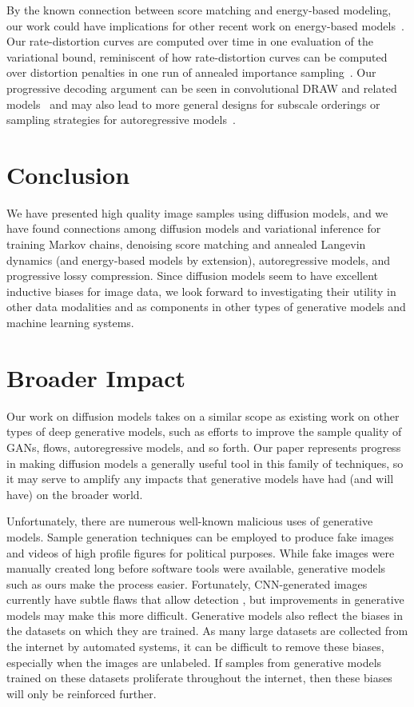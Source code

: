 By the known connection between score matching and energy-based modeling, our work could have implications for other recent work on energy-based models~\citep{xie2016theory,xie2017synthesizing,xie2018learning,gao2018learning,xie2019learning,gao2020flow,du2019implicit,nijkamp2019anatomy,grathwohl2020your,deng2020residual}. Our rate-distortion curves are computed over time in one evaluation of the variational bound, reminiscent of how rate-distortion curves can be computed over distortion penalties in one run of annealed importance sampling~\citep{huang2020evaluating}. Our progressive decoding argument can be seen in convolutional DRAW and related models~\citep{gregor2016towards,nichol2020vq} and may also lead to more general designs for subscale orderings or sampling strategies for autoregressive models~\citep{menick2018generating,wiggers2020predictive}.

\section{Conclusion}

We have presented high quality image samples using diffusion models, and we have found connections among diffusion models and variational inference for training Markov chains, denoising score matching and annealed Langevin dynamics (and energy-based models by extension), autoregressive models, and progressive lossy compression. Since diffusion models seem to have excellent inductive biases for image data, we look forward to investigating their utility in other data modalities and as components in other types of generative models and machine learning systems.

\section*{Broader Impact}

Our work on diffusion models takes on a similar scope as existing work on other types of deep generative models, such as efforts to improve the sample quality of GANs, flows, autoregressive models, and so forth. Our paper represents progress in making diffusion models a generally useful tool in this family of techniques, so it may serve to amplify any impacts that generative models have had (and will have) on the broader world.

Unfortunately, there are numerous well-known malicious uses of generative models. Sample generation techniques can be employed to produce fake images and videos of high profile figures for political purposes. While fake images were manually created long before software tools were available, generative models such as ours make the process easier. Fortunately, CNN-generated images currently have subtle flaws that allow detection \cite{wang2019cnngenerated}, but improvements in generative models may make this more difficult. Generative models also reflect the biases in the datasets on which they are trained. As many large datasets are collected from the internet by automated systems, it can be difficult to remove these biases, especially when the images are unlabeled. If samples from generative models trained on these datasets proliferate throughout the internet, then these biases will only be reinforced further.

